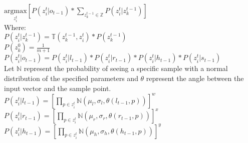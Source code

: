 \documentclass[12pt,letterpaper]{article}
\begin{document}
$\underset{z^t_i}{\text{argmax}}[P(z^t_i | o_{t-1})*\displaystyle\sum_{z^{t-1}_k \in \mathbb{Z}} P(z^t_i|z^{t-1}_k)] $\\
Where:\\
$P(z^t_i | z^{t-1}_k) = \mathbb{T}(z^{t-1}_k, z^t_i)*P(z^{t-1}_k)$\\
$P(z^0_k) = \frac{1}{m+1}$\\
$P(z^t_i|o_{t-1}) = P(z^t_i|l_{t-1})*P(z^t_i|r_{t-1})*P(z^t_i|h_{t-1})*P(z^t_i|s_{t-1})$\\
Let $\mathbb{N}$ represent the probability of seeing a specific sample with a  normal distribution of the specified parameters and $\theta$ represent the angle between the input vector and the sample point.\\
$P(z^t_i|l_{t-1}) = [\displaystyle \prod_{p \in z^t_i} \mathbb{N}(\mu_l, \sigma_l, \theta(l_{t-1}, p))]^w$\\
$P(z^t_i|r_{t-1})=[\displaystyle \prod_{p \in z^t_i} \mathbb{N}(\mu_r, \sigma_r, \theta(r_{t-1}, p))]^x$\\
$P(z^t_i|h_{t-1}) =[\displaystyle \prod_{p \in z^t_i} \mathbb{N}(\mu_h, \sigma_h, \theta(h_{t-1}, p))]^y$\\
\end{document}
